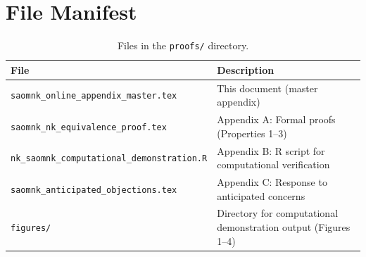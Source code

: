 \documentclass[12pt]{article}
\begin{document}

\newpage
\part*{File Manifest}

\begin{table}[h!]
\centering
\begin{tabular}{@{}lp{8cm}@{}}
\toprule
\textbf{File} & \textbf{Description} \\
\midrule
\texttt{saomnk\_online\_appendix\_master.tex} & This document (master appendix) \\
\texttt{saomnk\_nk\_equivalence\_proof.tex} & Appendix A: Formal proofs (Properties 1--3) \\
\texttt{nk\_saomnk\_computational\_demonstration.R} & Appendix B: R script for computational verification \\
\texttt{saomnk\_anticipated\_objections.tex} & Appendix C: Response to anticipated concerns \\
\texttt{figures/} & Directory for computational demonstration output (Figures 1--4) \\
\bottomrule
\end{tabular}
\caption{Files in the \texttt{proofs/} directory.}
\end{table}
\end{document}
